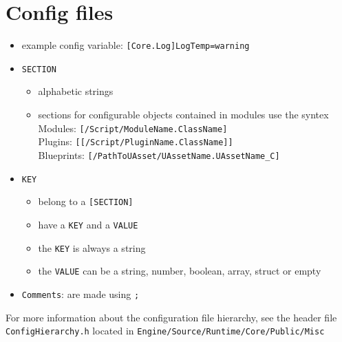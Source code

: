 \documentclass{scrbook}
\newcommand{\code}[1]{\colorbox{mygray}{\lstinline|#1|}}
\begin{document}
        \section{Config files}

            \begin{itemize}
                \item example config variable: \code{[Core.Log]LogTemp=warning}
                \item \code{SECTION}
                \begin{itemize}
                    \item alphabetic strings
                    \item sections for configurable objects contained in modules use the syntex \\
                    Modules: \code{[/Script/ModuleName.ClassName]} \\
                    Plugins: \code{[[/Script/PluginName.ClassName]]} \\
                    Blueprints: \code{[/PathToUAsset/UAssetName.UAssetName_C]} \\

                \end{itemize}
                \item \code{KEY}
                \begin{itemize}
                    \item belong to a \code{[SECTION]}
                    \item have a \code{KEY} and a \code{VALUE}
                    \item the \code{KEY} is always a string
                    \item the \code{VALUE} can be a string, number, boolean, array, struct or empty
                \end{itemize}
                \item \code{Comments}: are made using \code{;}
            \end{itemize}
            For more information about the configuration file hierarchy, see the header file \code{ConfigHierarchy.h} located in \code{Engine/Source/Runtime/Core/Public/Misc}
\end{document}
